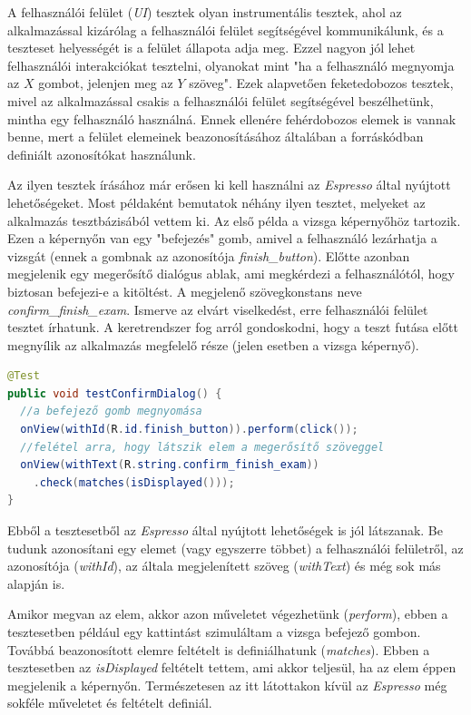 \documentclass[12pt,a4paper]{article}
\begin{document}
	A felhasználói felület (\textit{UI}) tesztek olyan instrumentális tesztek, ahol az alkalmazással kizárólag a felhasználói felület segítségével kommunikálunk, és a teszteset helyességét is a felület állapota adja meg. Ezzel nagyon jól lehet felhasználói interakciókat tesztelni, olyanokat mint "ha a felhasználó megnyomja az $X$ gombot, jelenjen meg az $Y$ szöveg". Ezek alapvetően feketedobozos tesztek, mivel az alkalmazással csakis a felhasználói felület segítségével beszélhetünk, mintha egy felhasználó használná. Ennek ellenére fehérdobozos elemek is vannak benne, mert a felület elemeinek beazonosításához általában a forráskódban definiált azonosítókat használunk.
	
	Az ilyen tesztek írásához már erősen ki kell használni az \textit{Espresso} által nyújtott lehetőségeket. Most példaként bemutatok néhány ilyen tesztet, melyeket az alkalmazás tesztbázisából vettem ki. Az első példa a vizsga képernyőhöz tartozik. Ezen a képernyőn van egy "befejezés" gomb, amivel a felhasználó lezárhatja a vizsgát (ennek a gombnak az azonosítója \textit{finish\_button}). Előtte azonban megjelenik egy megerősítő dialógus ablak, ami megkérdezi a felhasználótól, hogy biztosan befejezi-e a kitöltést. A megjelenő szövegkonstans neve \textit{confirm\_finish\_exam}. Ismerve az elvárt viselkedést, erre felhasználói felület tesztet írhatunk. A keretrendszer fog arról gondoskodni, hogy a teszt futása előtt megnyílik az alkalmazás megfelelő része (jelen esetben a vizsga képernyő).
	
	\begin{lstlisting}[language=Java]
@Test
public void testConfirmDialog() {
  //a befejező gomb megnyomása
  onView(withId(R.id.finish_button)).perform(click());
  //felétel arra, hogy látszik elem a megerősítő szöveggel
  onView(withText(R.string.confirm_finish_exam))
  	.check(matches(isDisplayed()));
}
	\end{lstlisting}
	
	Ebből a tesztesetből az \textit{Espresso} által nyújtott lehetőségek is jól látszanak. Be tudunk azonosítani egy elemet (vagy egyszerre többet) a felhasználói felületről, az azonosítója (\textit{withId}), az általa megjelenített szöveg (\textit{withText}) és még sok más alapján is.
	
	Amikor megvan az elem, akkor azon műveletet végezhetünk (\textit{perform}), ebben a tesztesetben például egy kattintást szimuláltam a vizsga befejező gombon. Továbbá beazonosított elemre feltételt is definiálhatunk (\textit{matches}). Ebben a tesztesetben az \textit{isDisplayed} feltételt tettem, ami akkor teljesül, ha az elem éppen megjelenik a képernyőn. Természetesen az itt látottakon kívül az \textit{Espresso} még sokféle műveletet és feltételt definiál.
	
\end{document}

